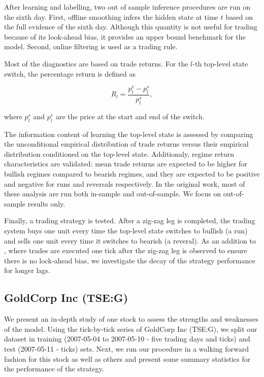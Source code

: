 \documentclass[]{article}
\begin{document}
After learning and labelling, two out of sample inference procedures are
run on the sixth day. First, offline smoothing infers the hidden state
at time \(t\) based on the full evidence of the sixth day. Although this
quantity is not useful for trading because of its look-ahead bias, it
provides an upper bound benchmark for the model. Second, online
filtering is used as a trading rule.

Most of the diagnostics are based on trade returns. For the \(l\)-th
top-level state switch, the percentage return is defined as

\[
R_l = \frac{p^e_l - p^s_l}{p^s_l},
\]

where \(p^s_l\) and \(p^e_l\) are the price at the start and end of the
switch.

The information content of learning the top-level state is assessed by
comparing the unconditional empirical distribution of trade returns
versus their empirical distribution conditioned on the top-level state.
Additionaly, regime return characteristics are validated: mean trade
returns are expected to be higher for bullish regimes compared to
bearish regimes, and they are expected to be positive and negative for
runs and reversals respectively. In the original work, most of these
analysis are run both in-sample and out-of-sample. We focus on
out-of-sample results only.

Finally, a trading strategy is tested. After a zig-zag leg is completed,
the trading system buys one unit every time the top-level state switches
to bullish (a run) and sells one unit every time it switches to bearish
(a reveral). As an addition to \citet{tayal2009regime}, where trades are
executed one tick after the zig-zag leg is observed to ensure there is
no lock-ahead bias, we investigate the decay of the strategy performance
for longer lags.

\subsection{GoldCorp Inc (TSE:G)}\label{goldcorp-inc-tseg}

We present an in-depth study of one stock to assess the strengths and
weaknesses of the model. Using the tick-by-tick series of GoldCorp Inc
(TSE:G), we split our dataset in training (2007-05-04 to 2007-05-10 -
five trading days and ticks) and test (2007-05-11 - ticks) sets. Next,
we run our procedure in a walking forward fashion for this stock as well
as others and present some summary statistics for the performance of the
strategy.
\end{document}
